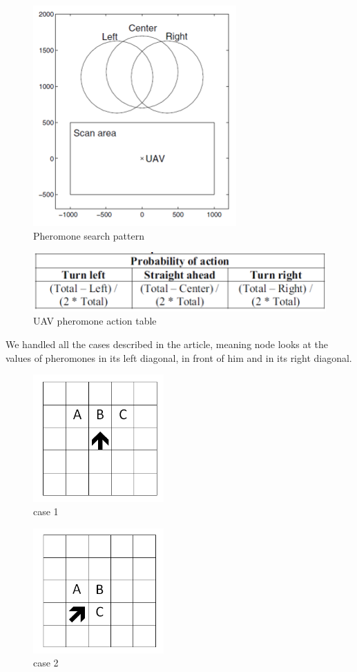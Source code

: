 \begin{figure}[!h]
\center
\includegraphics{../images/pheromon_model.png}
\caption{Pheromone search pattern\cite{UAV}}
\end{figure}

\begin{figure}[!h]
\center
\includegraphics{../images/pheromone_table.png}
\caption{UAV pheromone action table\cite{UAV}}
\end{figure}

We handled all the cases described in the article, meaning node looks at the values of pheromones in its left diagonal, in front of him and in its right diagonal.

\newpage

\begin{figure}[!h]
\center
\includegraphics[width=5cm]{../images/grille_case_1.png}
\caption{\label{case1}case 1}
\end{figure}

\begin{figure}[!h]
\center
\includegraphics[width=5cm]{../images/grille_case_2.png}
\caption{\label{case2}case 2}
\end{figure}

